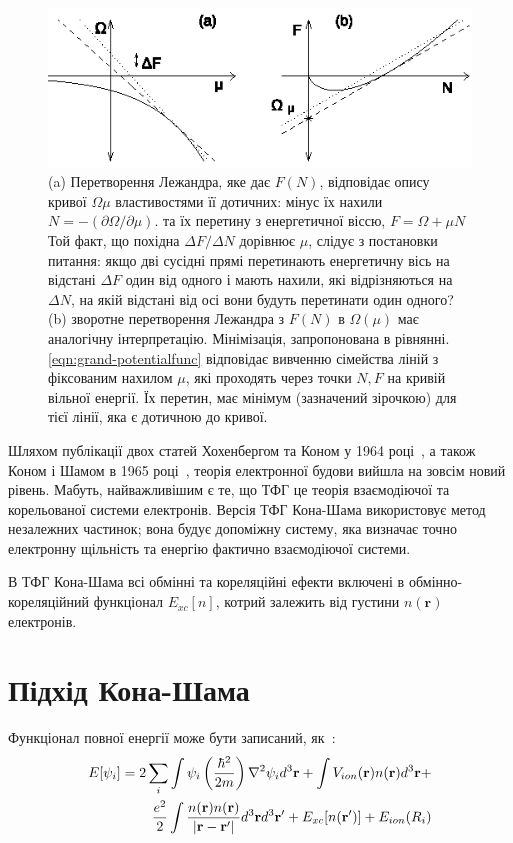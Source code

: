 \begin{figure}[h!]
  \centering
  \includegraphics[scale=2.5]{img/Legender_transform.eps}
  \caption{(a) Перетворення Лежандра, яке дає $F(N)$, відповідає опису кривої $\Omega\mu$ властивостями її дотичних: мінус їх нахили $N = -(\partial{\Omega}/\partial{\mu})$. та їх перетину з енергетичної віссю, $F = \Omega + \mu N$ Той факт, що похідна $\Delta F / \Delta N$ дорівнює $\mu$, слідує з постановки питання: якщо дві сусідні прямі перетинають енергетичну вісь на відстані $\Delta F$ один від одного і мають нахили, які відрізняються на $\Delta N$, на якій відстані від осі вони будуть перетинати один одного? (b) зворотне перетворення Лежандра з $F(N)$ в $\Omega (\mu)$ має аналогічну інтерпретацію. Мінімізація, запропонована в рівнянні. \ref{eqn:grand-potentialfunc} відповідає вивченню сімейства ліній з фіксованим нахилом $\mu$, які проходять через точки $N, F$ на кривій вільної енергії. Їх перетин, має мінімум (зазначений зірочкою) для тієї лінії, яка є дотичною до кривої.}
  \label{fig:legander_transform}
\end{figure}








Шляхом публікації двох статей Хохенбергом та Коном у 1964 році~\cite{Hohenberg&Khon}, а також Коном і Шамом в 1965 році~\cite{Khon&Sham}, теорія електронної будови вийшла на зовсім новий рівень. Мабуть, найважливішим є те, що ТФГ це теорія взаємодіючої та корельованої системи електронів. Версія ТФГ Кона-Шама використовує метод незалежних частинок; вона будує допоміжну систему, яка визначає точно електронну щільність та енергію фактично взаємодіючої системи.

В ТФГ Кона-Шама всі обмінні та кореляційні ефекти включені в обмінно-кореляційний функціонал $E_{xc}[n]$, котрий залежить від густини $n(\textbf{r})$ електронів. 

\section{Підхід Кона-Шама}
Функціонал повної енергії може бути записаний, як~\cite{K-S energy}:
\begin{eqnarray}
 E[\psi_i] = 2\sum\limits_{i}\int\psi_i\left({{\hbar^2}\over{2m}}\right)\nabla^2\psi_id^3\textbf{r}+\int V_{ion}(\textbf{r})n(\textbf{r})d^3\textbf{r}+\nonumber \\
 {{e^2}\over{2}}\int {{n(\textbf{r})n(\textbf{r})}\over{|\textbf{r}-\textbf{r}^\prime|}}d^3\textbf{r}d^3\textbf{r}^\prime+E_{xc}[n(\textbf{r}^\prime)]+E_{ion}(R_i)
\end{eqnarray}

